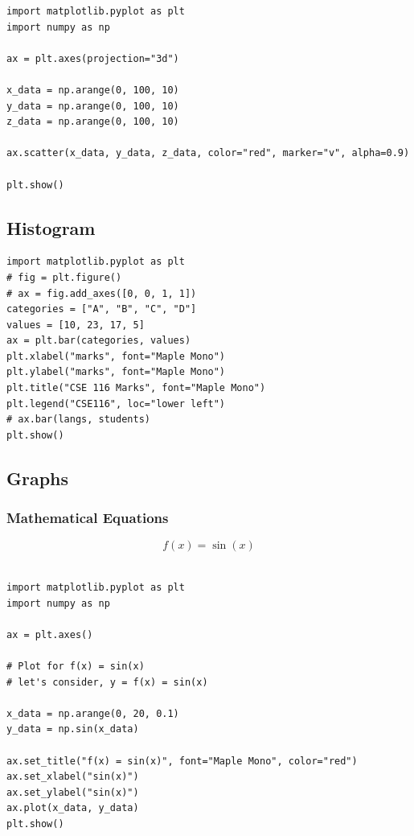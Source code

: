\documentclass{book}
\begin{document}
\begin{verbatim}
import matplotlib.pyplot as plt
import numpy as np

ax = plt.axes(projection="3d")

x_data = np.arange(0, 100, 10)
y_data = np.arange(0, 100, 10)
z_data = np.arange(0, 100, 10)

ax.scatter(x_data, y_data, z_data, color="red", marker="v", alpha=0.9)

plt.show()
\end{verbatim}
\subsection{Histogram}
\begin{verbatim}
import matplotlib.pyplot as plt
# fig = plt.figure()
# ax = fig.add_axes([0, 0, 1, 1])
categories = ["A", "B", "C", "D"]
values = [10, 23, 17, 5]
ax = plt.bar(categories, values)
plt.xlabel("marks", font="Maple Mono")
plt.ylabel("marks", font="Maple Mono")
plt.title("CSE 116 Marks", font="Maple Mono")
plt.legend("CSE116", loc="lower left")
# ax.bar(langs, students)
plt.show()
\end{verbatim}
\subsection{Graphs}
\subsubsection{Mathematical Equations}
\begin{equation}
	f(x) = \sin(x)
\end{equation}
\begin{verbatim}
   
import matplotlib.pyplot as plt
import numpy as np

ax = plt.axes()

# Plot for f(x) = sin(x)
# let's consider, y = f(x) = sin(x)

x_data = np.arange(0, 20, 0.1)
y_data = np.sin(x_data)

ax.set_title("f(x) = sin(x)", font="Maple Mono", color="red")
ax.set_xlabel("sin(x)")
ax.set_ylabel("sin(x)")
ax.plot(x_data, y_data)
plt.show()

\end{verbatim}
\end{document}
